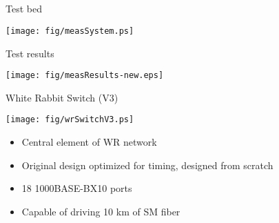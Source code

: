 \documentclass[compress,red]{beamer}
\begin{document}
\subsection{}
\begin{frame}{Test bed}

    \begin{center}
    \texttt{[image: fig/measSystem.ps]}
    \end{center}

\end{frame}
\begin{frame}{Test results}

    \begin{center}
    \texttt{[image: fig/measResults-new.eps]}
    \end{center}


\end{frame}
\begin{frame}{White Rabbit Switch (V3)}

    \begin{center}
    \texttt{[image: fig/wrSwitchV3.ps]}
    \end{center}

	\begin{itemize}
	\item Central element of WR network
	\item Original design optimized for timing, designed from scratch
	\item 18 1000BASE-BX10 ports
	\item Capable of driving 10 km of SM fiber
	\end{itemize}


\end{frame}
\end{document}
